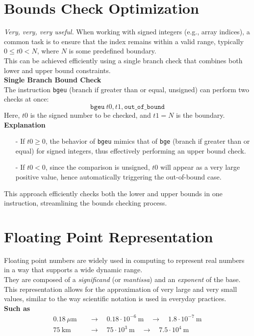 \section{Bounds Check Optimization}
\textit{Very, very, very useful.}
When working with signed integers (e.g., array indices), a common task is to ensure that the index remains within a valid range, typically \(0 \leq t0 < N\), where \(N\) is some predefined boundary. \\
This can be achieved efficiently using a single branch check that combines both lower and upper bound constraints. \\
\vspace*{7px}
\textbf{Single Branch Bound Check} \\
\vspace*{3px}
The instruction \texttt{bgeu} (branch if greater than or equal, unsigned) can perform two checks at once:
\[
\texttt{bgeu}\ t0, t1, \texttt{out\_of\_bound}
\]
Here, \(t0\) is the signed number to be checked, and \(t1 = N\) is the boundary. \\
\vspace*{7px}
\textbf{Explanation} \\
\begin{itemize}
    \item[-] If \(t0 \geq 0\), the behavior of \texttt{bgeu} mimics that of \texttt{bge} (branch if greater than or equal) for signed integers, thus effectively performing an upper bound check.
    \item[-] If \(t0 < 0\), since the comparison is unsigned, \(t0\) will appear as a very large positive value, hence automatically triggering the out-of-bound case.
\end{itemize}

This approach efficiently checks both the lower and upper bounds in one instruction, streamlining the bounds checking process.

\section{Floating Point Representation}

Floating point numbers are widely used in computing to represent real numbers in a way that supports a wide dynamic range. \\
\vspace*{5px}
They are composed of a \textit{significand} (or \textit{mantissa}) and an \textit{exponent} of the base. This representation allows for the approximation of very large and very small values, similar to the way scientific notation is used in everyday practices.\\
\vspace*{5px}
\textbf{Such as}
\begin{align*}
    0.18 \ \mu\text{m} & \quad \rightarrow \quad 0.18 \cdot 10^{-6} \ \text{m} \quad \rightarrow \quad 1.8 \cdot 10^{-7} \ \text{m} \\
    75 \ \text{km} & \quad \rightarrow \quad 75 \cdot 10^{3} \ \text{m} \quad \rightarrow \quad 7.5 \cdot 10^{4} \ \text{m}
\end{align*}


